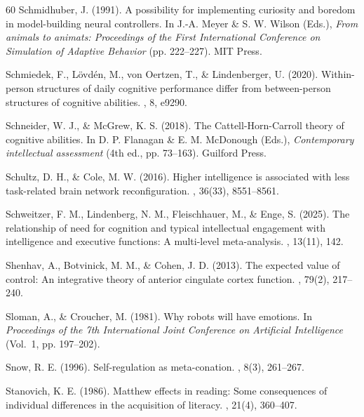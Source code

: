 \documentclass[12pt,a4paper]{article}
\begin{document}
\begin{thebibliography}{60}
Schmidhuber, J. (1991).
\newblock A possibility for implementing curiosity and boredom in model-building neural controllers.
\newblock In J.-A. Meyer \& S. W. Wilson (Eds.), {\em From animals to animats: Proceedings of the First International Conference on Simulation of Adaptive Behavior} (pp. 222--227). MIT Press.

Schmiedek, F., L\"ovd\'en, M., von Oertzen, T., \& Lindenberger, U. (2020).
\newblock Within-person structures of daily cognitive performance differ from between-person structures of cognitive abilities.
, 8, e9290.

Schneider, W. J., \& McGrew, K. S. (2018).
\newblock The Cattell-Horn-Carroll theory of cognitive abilities.
\newblock In D. P. Flanagan \& E. M. McDonough (Eds.), {\em Contemporary intellectual assessment} (4th ed., pp. 73--163). Guilford Press.

Schultz, D. H., \& Cole, M. W. (2016).
\newblock Higher intelligence is associated with less task-related brain network reconfiguration.
, 36(33), 8551--8561.

Schweitzer, F. M., Lindenberg, N. M., Fleischhauer, M., \& Enge, S. (2025).
\newblock The relationship of need for cognition and typical intellectual engagement with intelligence and executive functions: A multi-level meta-analysis.
, 13(11), 142.

Shenhav, A., Botvinick, M. M., \& Cohen, J. D. (2013).
\newblock The expected value of control: An integrative theory of anterior cingulate cortex function.
, 79(2), 217--240.

Sloman, A., \& Croucher, M. (1981).
\newblock Why robots will have emotions.
\newblock In {\em Proceedings of the 7th International Joint Conference on Artificial Intelligence} (Vol.~1, pp. 197--202).

Snow, R. E. (1996).
\newblock Self-regulation as meta-conation.
, 8(3), 261--267.

Stanovich, K. E. (1986).
\newblock Matthew effects in reading: Some consequences of individual differences in the acquisition of literacy.
, 21(4), 360--407.


\end{thebibliography}
\end{document}
